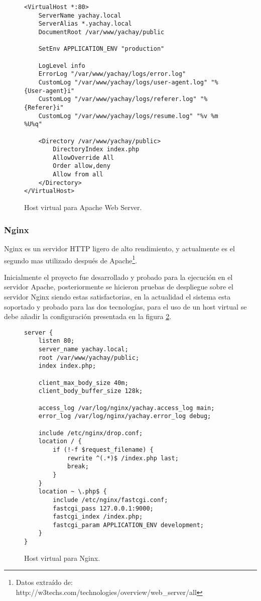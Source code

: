 \begin{figure}
\begin{verbatim}
<VirtualHost *:80>
    ServerName yachay.local
    ServerAlias *.yachay.local
    DocumentRoot /var/www/yachay/public

    SetEnv APPLICATION_ENV "production"

    LogLevel info
    ErrorLog "/var/www/yachay/logs/error.log"
    CustomLog "/var/www/yachay/logs/user-agent.log" "%{User-agent}i"
    CustomLog "/var/www/yachay/logs/referer.log" "%{Referer}i"
    CustomLog "/var/www/yachay/logs/resume.log" "%v %m %U%q"

    <Directory /var/www/yachay/public>
        DirectoryIndex index.php
        AllowOverride All
        Order allow,deny
        Allow from all
    </Directory>
</VirtualHost>
\end{verbatim}
\caption{Host virtual para Apache Web Server.}
\label{config_apache}
\end{figure}

\subsubsection{Nginx}
Nginx es un servidor HTTP ligero de alto rendimiento, y actualmente es el
segundo mas utilizado después de Apache\footnote{Datos extraído de:
http://w3techs.com/technologies/overview/web\_server/all}.

Inicialmente el proyecto fue desarrollado y probado para la ejecución en el
servidor Apache, posteriormente se hicieron pruebas de despliegue sobre el
servidor Nginx siendo estas satisfactorias, en la actualidad el sistema esta
soportado y probado para las dos tecnologías, para el uso de un host virtual se
debe añadir la configuración presentada en la figura \ref{config_nginx}.

\begin{figure}
\begin{verbatim}
server {
    listen 80;
    server_name yachay.local;
    root /var/www/yachay/public;
    index index.php;

    client_max_body_size 40m;
    client_body_buffer_size 128k;

    access_log /var/log/nginx/yachay.access_log main;
    error_log /var/log/nginx/yachay.error_log debug;

    include /etc/nginx/drop.conf;
    location / {
        if (!-f $request_filename) {
            rewrite ^(.*)$ /index.php last;
            break;
        }
    }
    location ~ \.php$ {
        include /etc/nginx/fastcgi.conf;
        fastcgi_pass 127.0.0.1:9000;
        fastcgi_index /index.php;
        fastcgi_param APPLICATION_ENV development;
    }
}
\end{verbatim}
\caption{Host virtual para Nginx.}
\label{config_nginx}
\end{figure}

